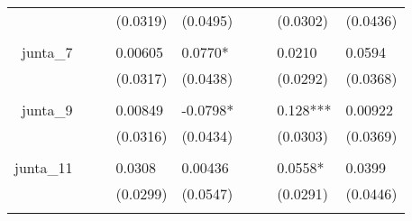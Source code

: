 \begin{tabular}{rrrrrrrrr}
      & \multicolumn{1}{l}{} & \multicolumn{1}{l}{} & \multicolumn{1}{l}{(0.0319)} & \multicolumn{1}{l}{(0.0495)} & \multicolumn{1}{l}{} & \multicolumn{1}{l}{} & \multicolumn{1}{l}{(0.0302)} & \multicolumn{1}{l}{(0.0436)} \\
      & \multicolumn{1}{l}{} & \multicolumn{1}{l}{} & \multicolumn{1}{l}{} & \multicolumn{1}{l}{} & \multicolumn{1}{l}{} & \multicolumn{1}{l}{} & \multicolumn{1}{l}{} & \multicolumn{1}{l}{} \\
junta\_7 & \multicolumn{1}{l}{} & \multicolumn{1}{l}{} & \multicolumn{1}{l}{0.00605} & \multicolumn{1}{l}{0.0770*} & \multicolumn{1}{l}{} & \multicolumn{1}{l}{} & \multicolumn{1}{l}{0.0210} & \multicolumn{1}{l}{0.0594} \\
      & \multicolumn{1}{l}{} & \multicolumn{1}{l}{} & \multicolumn{1}{l}{(0.0317)} & \multicolumn{1}{l}{(0.0438)} & \multicolumn{1}{l}{} & \multicolumn{1}{l}{} & \multicolumn{1}{l}{(0.0292)} & \multicolumn{1}{l}{(0.0368)} \\
      & \multicolumn{1}{l}{} & \multicolumn{1}{l}{} & \multicolumn{1}{l}{} & \multicolumn{1}{l}{} & \multicolumn{1}{l}{} & \multicolumn{1}{l}{} & \multicolumn{1}{l}{} & \multicolumn{1}{l}{} \\
junta\_9 & \multicolumn{1}{l}{} & \multicolumn{1}{l}{} & \multicolumn{1}{l}{0.00849} & \multicolumn{1}{l}{-0.0798*} & \multicolumn{1}{l}{} & \multicolumn{1}{l}{} & \multicolumn{1}{l}{0.128***} & \multicolumn{1}{l}{0.00922} \\
      & \multicolumn{1}{l}{} & \multicolumn{1}{l}{} & \multicolumn{1}{l}{(0.0316)} & \multicolumn{1}{l}{(0.0434)} & \multicolumn{1}{l}{} & \multicolumn{1}{l}{} & \multicolumn{1}{l}{(0.0303)} & \multicolumn{1}{l}{(0.0369)} \\
      & \multicolumn{1}{l}{} & \multicolumn{1}{l}{} & \multicolumn{1}{l}{} & \multicolumn{1}{l}{} & \multicolumn{1}{l}{} & \multicolumn{1}{l}{} & \multicolumn{1}{l}{} & \multicolumn{1}{l}{} \\
junta\_11 & \multicolumn{1}{l}{} & \multicolumn{1}{l}{} & \multicolumn{1}{l}{0.0308} & \multicolumn{1}{l}{0.00436} & \multicolumn{1}{l}{} & \multicolumn{1}{l}{} & \multicolumn{1}{l}{0.0558*} & \multicolumn{1}{l}{0.0399} \\
      & \multicolumn{1}{l}{} & \multicolumn{1}{l}{} & \multicolumn{1}{l}{(0.0299)} & \multicolumn{1}{l}{(0.0547)} & \multicolumn{1}{l}{} & \multicolumn{1}{l}{} & \multicolumn{1}{l}{(0.0291)} & \multicolumn{1}{l}{(0.0446)} \\
      & \multicolumn{1}{l}{} & \multicolumn{1}{l}{} & \multicolumn{1}{l}{} & \multicolumn{1}{l}{} & \multicolumn{1}{l}{} & \multicolumn{1}{l}{} & \multicolumn{1}{l}{} & \multicolumn{1}{l}{} \\

\end{tabular}
